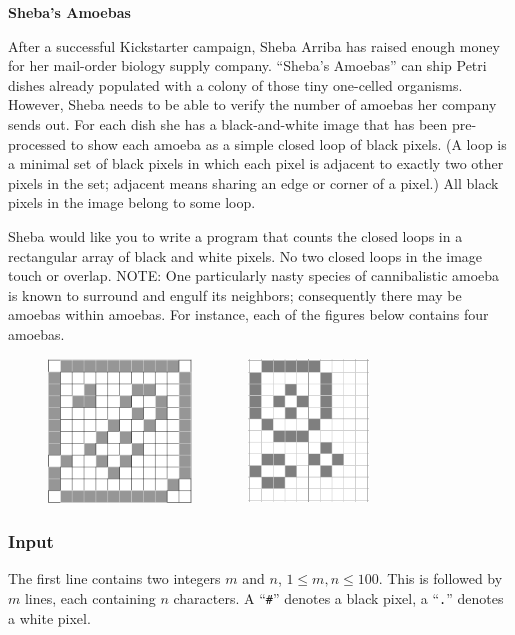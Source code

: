 \documentclass{article}
\begin{document}
\begin{center}
\large\bf Sheba's Amoebas
\end{center}
After a successful Kickstarter campaign, Sheba Arriba has raised
enough money for her mail-order biology supply company.
``Sheba's Amoebas'' can ship Petri dishes already populated with
a colony of those tiny one-celled organisms. However, Sheba
needs to be able to verify the number of amoebas her company sends out.
For each dish she has a black-and-white image that has been
pre-processed to show each amoeba as a simple closed
loop of black pixels. (A loop is a minimal set of black pixels in which
each pixel is adjacent to exactly two other pixels in the set; adjacent means
sharing an edge or corner of a pixel.) All black pixels in the image
belong to some loop. 

Sheba would like you
to write a program that counts the closed loops in a rectangular array
of black and white pixels. 
No two closed loops in the image touch or overlap.
NOTE:
One particularly nasty species of cannibalistic amoeba is known to surround
and engulf its neighbors; consequently there may be amoebas within amoebas.
For instance, each of the figures
below contains four amoebas.

\begin{figure}[htbp]
\centering
\includegraphics[height=1.5in]{12by12sample}\ \ \ \ \ \ \ \ 
\includegraphics[height=1.5in]{12by10sample}
\end{figure}

\subsubsection*{Input}
The first line contains two integers $m$ and $n$, $1 \leq m,n \leq 100$.
This is followed by $m$ lines, each containing $n$ characters. A
``\verb$#$'' denotes a black pixel, a ``\verb$.$'' denotes a white pixel.
\end{document}
